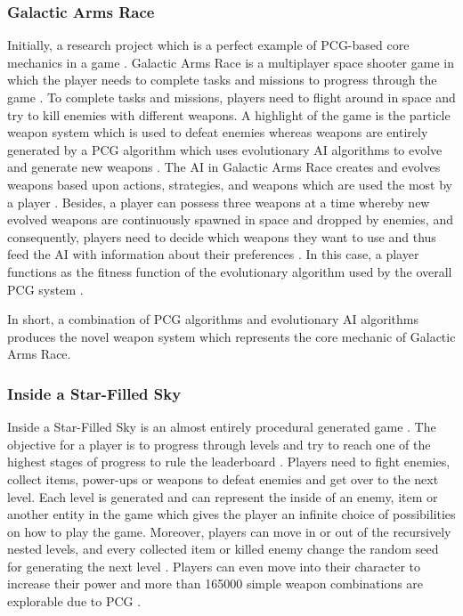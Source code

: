 \documentclass[MGS,Master,english]{twbook}%
\begin{document}
\subsubsection{Galactic Arms Race}
Initially, a research project which is a perfect example of PCG-based core mechanics in a game \cite{game::galacticArmsRace}. Galactic Arms Race is a multiplayer space shooter game in which the player needs to complete tasks and missions to progress through the game \cite{game::galacticArmsRace}. To complete tasks and missions, players need to flight around in space and try to kill enemies with different weapons. A highlight of the game is the particle weapon system which is used to defeat enemies whereas weapons are entirely generated by a PCG algorithm which uses evolutionary AI algorithms to evolve and generate new weapons \cite{pcg::galacticArmsRace}. The AI in Galactic Arms Race creates and evolves weapons based upon actions, strategies, and weapons which are used the most by a player \cite{pcg::galacticArmsRace} \cite{pcg::galacticArmsRace::evolvingContent}. Besides, a player can possess three weapons at a time whereby new evolved weapons are continuously spawned in space and dropped by enemies, and consequently, players need to decide which weapons they want to use and thus feed the AI with information about their preferences \cite{pcg::galacticArmsRace::evolvingContent}. In this case, a player functions as the fitness function of the evolutionary algorithm used by the overall PCG system \cite{pcg::galacticArmsRace::evolvingContent}.

In short, a combination of PCG algorithms and evolutionary AI algorithms produces the novel weapon system which represents the core mechanic of Galactic Arms Race.

\subsubsection{Inside a Star-Filled Sky}
Inside a Star-Filled Sky is an almost entirely procedural generated game \cite{game::insideAStarFilledSky}. The objective for a player is to progress through levels and try to reach one of the highest stages of progress to rule the leaderboard \cite{game::insideAStarFilledSky}. Players need to fight enemies, collect items, power-ups or weapons to defeat enemies and get over to the next level. Each level is generated and can represent the inside of an enemy, item or another entity in the game which gives the player an infinite choice of possibilities on how to play the game. Moreover, players can move in or out of the recursively nested levels, and every collected item or killed enemy change the random seed for generating the next level \cite{pcg::endlessWeb}. Players can even move into their character to increase their power and more than 165000 simple weapon combinations are explorable due to PCG \cite{game::insideAStarFilledSky}.
\end{document}
